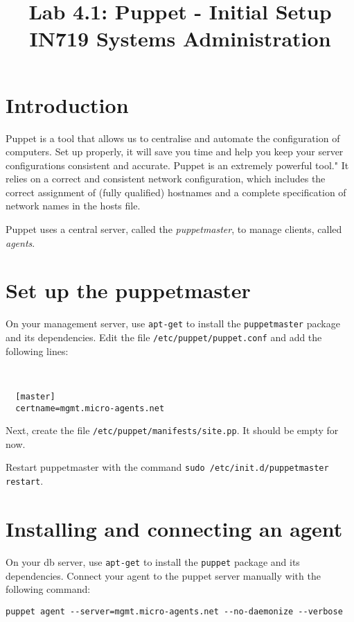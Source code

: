 \documentclass{article}
\begin{document}
\title{Lab 4.1: Puppet - Initial Setup \\ IN719 Systems Administration}
\date{}
\maketitle

\section*{Introduction}
Puppet is a tool that allows us to centralise and automate the configuration of computers.  Set up properly, it will save you time and help you keep your server configurations consistent and accurate.  Puppet is an extremely powerful tool." It relies on a correct and consistent network configuration, which includes the correct assignment of (fully qualified) hostnames and a complete specification of network names in the hosts file.

Puppet uses a central server, called the \emph{puppetmaster}, to manage clients, called \emph{agents}.

\section{Set up the puppetmaster}
On your management server, use \texttt{apt-get} to install the \texttt{puppetmaster} package and its dependencies.  Edit the file \texttt{/etc/puppet/puppet.conf} and add the following lines:

\
\begin{verbatim}
  [master]
  certname=mgmt.micro-agents.net
\end{verbatim}

Next, create the file \texttt{/etc/puppet/manifests/site.pp}.  It should be empty for now.

Restart puppetmaster with the command \texttt{sudo /etc/init.d/puppetmaster restart}.

\section{Installing and connecting an agent}
On your db server, use \texttt{apt-get} to install the \texttt{puppet} package and its dependencies.  Connect your agent to the puppet server manually with the following command:

\begin{verbatim}
puppet agent --server=mgmt.micro-agents.net --no-daemonize --verbose
\end{verbatim}
\end{document}
